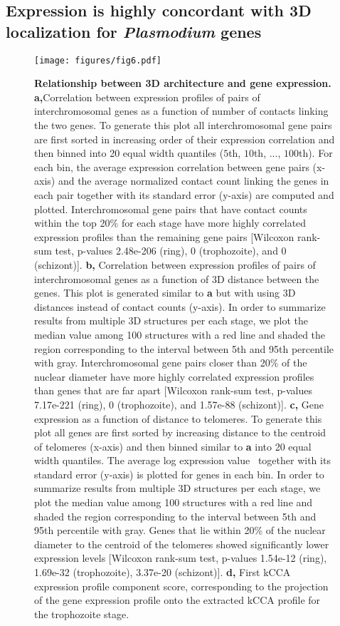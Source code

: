 \subsection{Expression is highly concordant with 3D localization for {\em Plasmodium} genes}

\begin{figure}[h]
\texttt{[image: figures/fig6.pdf]}
\centering
\caption{{\bf Relationship between 3D architecture and gene expression.}
\textbf{a,}Correlation between expression profiles of pairs of
interchromosomal genes as a function of number of contacts linking the two
genes. To generate this plot all interchromosomal gene pairs are first sorted
in increasing order of their expression correlation and then binned into 20
equal width quantiles ($5$th, $10$th, ..., $100$th). For each bin, the average
expression correlation between gene pairs (x-axis) and the average normalized
contact count linking the genes in each pair together with its standard error
(y-axis) are computed and plotted. Interchromosomal gene pairs that have
contact counts within the top 20\% for each stage have more highly correlated
expression profiles than the remaining gene pairs [Wilcoxon rank-sum test,
p-values 2.48e-206 (ring), 0 (trophozoite), and 0 (schizont)].
\textbf{b,} Correlation between expression profiles of pairs of
interchromosomal genes as a function of 3D distance between the genes. This
plot is generated similar to \textbf{a} but with using 3D distances instead of
contact counts (y-axis). In order to summarize results from multiple 3D
structures per each stage, we plot the median value among 100 structures with
a red line and shaded the region corresponding to the interval between 5th and
95th percentile with gray. Interchromosomal gene pairs closer than 20\% of the
nuclear diameter have more highly correlated expression profiles than genes
that are far apart [Wilcoxon rank-sum test, p-values 7.17e-221 (ring), 0
(trophozoite), and 1.57e-88 (schizont)].
\textbf{c,} Gene expression as a function of distance to telomeres. To
generate this plot all genes are first sorted by increasing distance to the
centroid of telomeres (x-axis) and then binned similar to \textbf{a} into 20
equal width quantiles. The average log expression
value~\citep{bunnik:polysome}
together with its standard error (y-axis) is plotted for genes in each bin. In
order to summarize results from multiple 3D structures per each stage, we plot
the median value among 100 structures with a red line and shaded the region
corresponding to the interval between 5th and 95th percentile with gray. Genes
that lie within 20\% of the nuclear diameter to the centroid of the telomeres
showed significantly lower expression levels [Wilcoxon rank-sum test, p-values
1.54e-12 (ring), 1.69e-32 (trophozoite), 3.37e-20 (schizont)].
\textbf{d,} First kCCA expression profile component score, corresponding to
the projection of the gene expression profile onto the extracted kCCA profile
for the trophozoite stage.}
\label{fig:fig6}
\end{figure}




